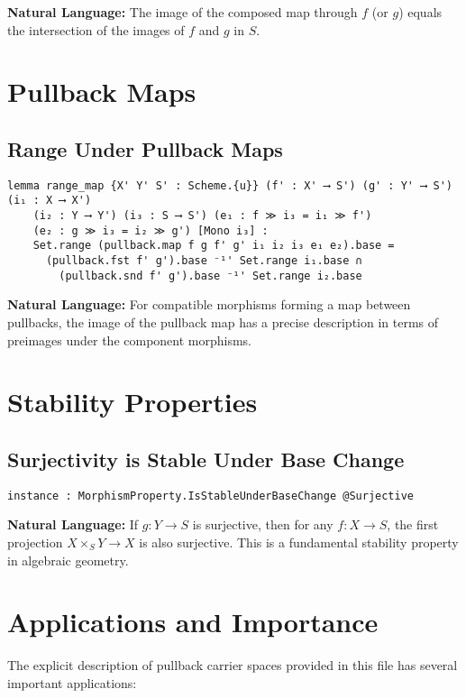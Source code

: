 \documentclass{article}
\theoremstyle{definition}
\begin{document}
\textbf{Natural Language:} The image of the composed map through $f$ (or $g$) equals the intersection of the images of $f$ and $g$ in $S$.

\section{Pullback Maps}

\subsection{Range Under Pullback Maps}

\begin{lstlisting}
lemma range_map {X' Y' S' : Scheme.{u}} (f' : X' ⟶ S') (g' : Y' ⟶ S') (i₁ : X ⟶ X')
    (i₂ : Y ⟶ Y') (i₃ : S ⟶ S') (e₁ : f ≫ i₃ = i₁ ≫ f')
    (e₂ : g ≫ i₃ = i₂ ≫ g') [Mono i₃] :
    Set.range (pullback.map f g f' g' i₁ i₂ i₃ e₁ e₂).base =
      (pullback.fst f' g').base ⁻¹' Set.range i₁.base ∩
        (pullback.snd f' g').base ⁻¹' Set.range i₂.base
\end{lstlisting}

\textbf{Natural Language:} For compatible morphisms forming a map between pullbacks, the image of the pullback map has a precise description in terms of preimages under the component morphisms.

\section{Stability Properties}

\subsection{Surjectivity is Stable Under Base Change}

\begin{lstlisting}
instance : MorphismProperty.IsStableUnderBaseChange @Surjective
\end{lstlisting}

\textbf{Natural Language:} If $g: Y \to S$ is surjective, then for any $f: X \to S$, the first projection $X \times_S Y \to X$ is also surjective. This is a fundamental stability property in algebraic geometry.

\section{Applications and Importance}

The explicit description of pullback carrier spaces provided in this file has several important applications:
\end{document}
